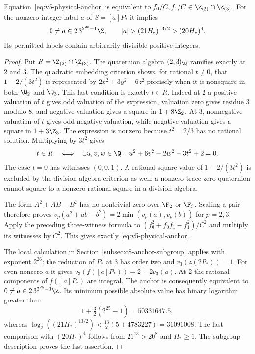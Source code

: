 \begin{lemma}\label{lem:v5-three-witness-anchor}
Equation~\eqref{eq:v5-physical-anchor} is equivalent to
$f_0/C,f_1/C\in\Z_{(2)}\cap\Z_{(3)}$. For the nonzero integer label
$a$ of $S=[a]P_*$ it implies
\[
 0\ne a\in2\,3^{2^{25}-1}\Z,\qquad
 |a|>(21H_*)^{13/2}>(20H_*)^4.
\]
Its permitted labels contain arbitrarily divisible positive integers.
\end{lemma}
\begin{proof}
Put $R=\Z_{(2)}\cap\Z_{(3)}$. The quaternion algebra $(2,3)_\Q$
ramifies exactly at 2 and 3. The quadratic embedding criterion
\cite[Proposition 14.6.7]{voight2021} shows, for rational $t\ne0$,
that $1-2/(3t^2)$ is represented by $2x^2+3y^2-6z^2$ precisely
when it is nonsquare in both $\Q_2$ and $\Q_3$. This last condition
is exactly $t\in R$. Indeed at 2 a positive valuation of $t$ gives
odd valuation of the expression, valuation zero gives residue 3
modulo 8, and negative valuation gives a square in $1+8\Z_2$.
At 3, nonnegative valuation of $t$ gives odd negative valuation,
while negative valuation gives a square in $1+3\Z_3$.
The expression is nonzero because $t^2=2/3$ has no rational solution.
Multiplying by $3t^2$ gives
\[
 t\in R\quad\Longleftrightarrow\quad
 \exists u,v,w\in\Q:\ u^2+6v^2-2w^2-3t^2+2=0.
\]
The case $t=0$ has witnesses $(0,0,1)$. A rational-square value of
$1-2/(3t^2)$ is excluded by the division-algebra criterion as well:
a nonzero trace-zero quaternion cannot square to a nonzero rational
square in a division algebra.

The form $A^2+AB-B^2$ has no nontrivial zero over $\F_2$ or $\F_3$.
Scaling a pair therefore proves
$v_p(a^2+ab-b^2)=2\min(v_p(a),v_p(b))$ for $p=2,3$.
Apply the preceding three-witness formula to
$(f_0^2+f_0f_1-f_1^2)/C^2$ and multiply its witnesses by $C^2$.
This gives exactly \eqref{eq:v5-physical-anchor}.

The local calculation in Section~\ref{subsec:o8-anchor-subgroup}
applies with exponent $2^{26}$: the reduction of $P_*$ at 3 has
order two and $v_3(z(2P_*))=1$. For even nonzero $a$ it gives
$v_3(f([a]P_*))=2+2v_3(a)$. At 2 the rational components of
$f([a]P_*)$ are integral. The anchor is consequently equivalent to
$0\ne a\in2\,3^{2^{25}-1}\Z$. Its minimum possible absolute value
has binary logarithm greater than
\[
 1+\tfrac32(2^{25}-1)=50331647.5,
\]
whereas
$\log_2((21H_*)^{13/2})<\tfrac{13}{2}(5+4783227)=31091008$.
The last comparison with $(20H_*)^4$ follows from
$21^{13}>20^8$ and $H_*\ge1$. The subgroup description proves the
last assertion.
\end{proof}

